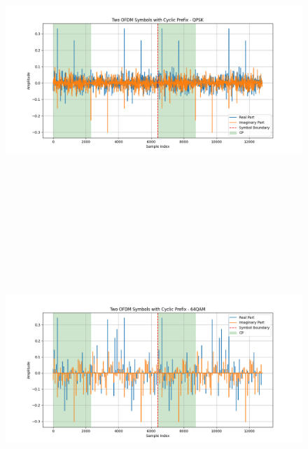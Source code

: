\documentclass[letterpaper, 11pt]{article}
\begin{document}
\newpage
\begin{figure}[h!]
    \centering
    \includegraphics[width=\textwidth,height=4.25in]{QPSK.png}
    \includegraphics[width=\textwidth,height=4.25in]{64QAM.png}
\end{figure}
\end{document}
